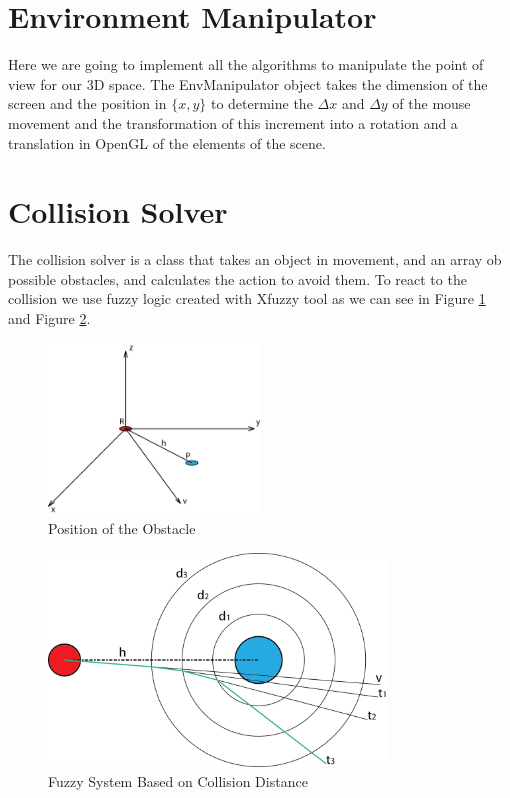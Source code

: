 \documentclass[12pt,a4paper,oneside,english]{book}
\begin{document}
\section{Environment Manipulator}

Here we are going to implement all the algorithms to manipulate the point of view for our 3D space. The EnvManipulator object takes the dimension of the screen and the position in $\{x,y\}$ to determine the $\Delta x$ and $\Delta y$ of the mouse movement and the transformation of this increment into a rotation and a translation in OpenGL of the elements of the scene.

\section{Collision Solver}

The collision solver is a class that takes an object in movement, and an array ob possible obstacles, and calculates the action to avoid them. To react to the collision we use fuzzy logic created with Xfuzzy tool as we can see in Figure \ref{position of the obstacle} and Figure \ref{fuzzy system based on collision distance}.

\begin{figure}[htbp]
\begin{center}
\includegraphics[width=0.5\textwidth]{images/AC01.png}
\caption{Position of the Obstacle}
\label{position of the obstacle}
\end{center}
\end{figure}

\begin{figure}[htbp]
\begin{center}
\includegraphics[width=0.8\textwidth]{images/AC02.png}
\caption{Fuzzy System Based on Collision Distance}
\label{fuzzy system based on collision distance}
\end{center}
\end{figure}
\end{document}
